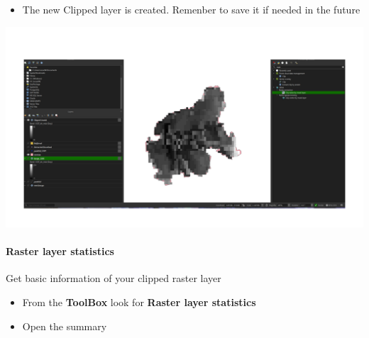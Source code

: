 \documentclass[
  letterpaper,
  DIV=11,
  numbers=noendperiod]{scrartcl}
\let\oldparagraph\paragraph
\renewcommand{\paragraph}[1]{\oldparagraph{#1}\mbox{}}
\providecommand{\tightlist}{%
  \setlength{\itemsep}{0pt}\setlength{\parskip}{0pt}}\usepackage{longtable,booktabs,array}
\begin{document}
\begin{itemize}
\tightlist
\item
  The new Clipped layer is created. Remenber to save it if needed in the
  future
\end{itemize}

\includegraphics{Lab1/qgis_ss/QGIS_ss26.png}

\hypertarget{raster-layer-statistics}{%
\paragraph{Raster layer statistics}\label{raster-layer-statistics}}

Get basic information of your clipped raster layer

\begin{itemize}
\tightlist
\item
  From the \textbf{ToolBox} look for \textbf{Raster layer statistics}
\item
  Open the summary
\end{itemize}
\end{document}
